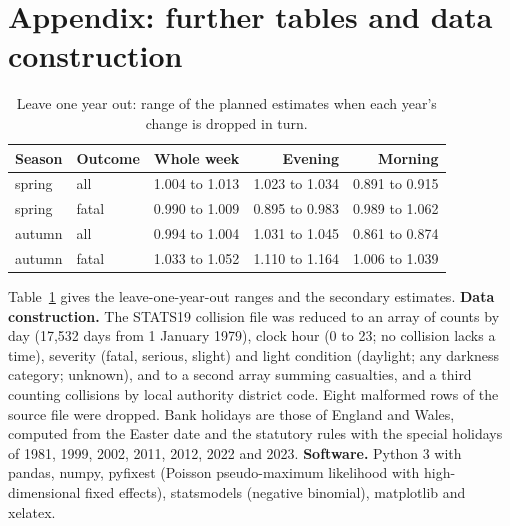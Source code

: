 \documentclass[11pt,a4paper]{article}
\begin{document}
\appendix
\section{Appendix: further tables and data construction}
\begin{table}[htbp]\centering\small\caption{Leave one year out: range of the planned estimates when each year's change is dropped in turn.}\label{tab:appx}\begin{tabular}{llrrr}\toprule Season & Outcome & Whole week & Evening & Morning\\\midrule
spring & all & 1.004 to 1.013 & 1.023 to 1.034 & 0.891 to 0.915\\
spring & fatal & 0.990 to 1.009 & 0.895 to 0.983 & 0.989 to 1.062\\
autumn & all & 0.994 to 1.004 & 1.031 to 1.045 & 0.861 to 0.874\\
autumn & fatal & 1.033 to 1.052 & 1.110 to 1.164 & 1.006 to 1.039\\
\bottomrule\end{tabular}\end{table}

Table~\ref{tab:appx} gives the leave-one-year-out ranges and the secondary estimates. \textbf{Data construction.} The STATS19 collision file was reduced to an array of counts by day (17,532 days from 1 January 1979), clock hour (0 to 23; no collision lacks a time), severity (fatal, serious, slight) and light condition (daylight; any darkness category; unknown), and to a second array summing casualties, and a third counting collisions by local authority district code. Eight malformed rows of the source file were dropped. Bank holidays are those of England and Wales, computed from the Easter date and the statutory rules with the special holidays of 1981, 1999, 2002, 2011, 2012, 2022 and 2023. \textbf{Software.} Python 3 with pandas, numpy, pyfixest (Poisson pseudo-maximum likelihood with high-dimensional fixed effects), statsmodels (negative binomial), matplotlib and xelatex.
\end{document}
